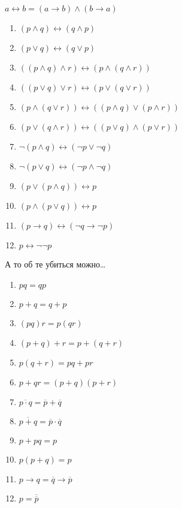 \begin{definition} $a \leftrightarrow b = (a \to b) \land (b \to  a)$ \end{definition}

\begin{example} \thmslashn

    \begin{enumerate}
        \item $(p \land q) \leftrightarrow (q \land p)$
        \item $(p \lor q) \leftrightarrow (q \lor p)$
        \item $((p \land q) \land r) \leftrightarrow (p \land (q \land r))$
        \item $((p \lor q) \lor r) \leftrightarrow (p \lor (q \lor r))$
        \item $(p \land (q \lor r)) \leftrightarrow ((p \land q) \lor (p \land r))$
        \item $(p \lor (q \land r)) \leftrightarrow ((p \lor q) \land (p \lor r))$
        \item $\neg(p \land q) \leftrightarrow (\neg p \lor \neg q)$
        \item $\neg(p\lor q) \leftrightarrow (\neg p \land \neg q)$
        \item $(p \lor (p \land q)) \leftrightarrow p$
        \item $(p \land (p \lor q)) \leftrightarrow p$
        \item $(p \to q) \leftrightarrow (\neg q \to \neg p)$
        \item $p \leftrightarrow \neg\neg p$
    \end{enumerate}
\end{example}

\begin{example} \thmslashn

    А то об те убиться можно\ldots

    \begin{enumerate}
        \item $pq = qp$
        \item $p+q = q+p$
        \item $(pq)r = p(qr)$
        \item $(p+q)+r = p+(q+r)$
        \item $p(q+r) = pq+pr$
        \item $p+qr = (p+q)(p+r)$
        \item $\overline{p \cdot q} = \overline{p} + \overline{q}$ 
        \item $\overline{p + q} = \overline{p} \cdot  \overline{q}$ 
        \item $p + pq = p$
        \item $p(p+q) = p$
        \item $p \to q = \overline{q} \to \overline{p}$ 
        \item $p = \overline{\overline{p}}$
    \end{enumerate}
\end{example}

